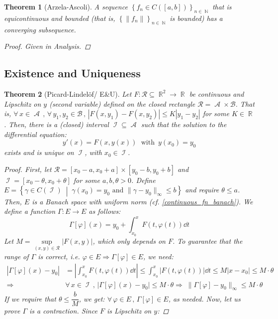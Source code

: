 \documentclass[12pt]{article}
\let\RA\Rightarrow
\newcommand{\set}[2]{\left\{{#1}\;\middle|\;{#2}\right\}}
\newcommand{\Forall}[1]{\forall\,{#1}\,,\,}
\DeclareMathOperator{\R}{\mathbb{R}}
\DeclareMathOperator{\N}{\mathbb{N}}
\DeclareMathOperator{\I}{\mathcal{I}}
\DeclareMathOperator{\A}{\mathcal{A}}
\newcommand{\seq}[2][n]{{\left\{#2\right\}}_{#1\in\N}}
\newtheorem{theorem}{Theorem}[subsection]
\begin{document}
\begin{theorem}[Arzela-Ascoli]
  \label{arzela_ascoli}
  A sequence $\seq{f_n\in C([a,b])}$ that is equicontinuous and bounded (that is, $\seq{\|f_n\|}$ is bounded) has a converging subsequence.
  \begin{proof}
    Given in Analysis.
  \end{proof}
\end{theorem}

\pagebreak

\subsection{Existence and Uniqueness}

\begin{theorem}[Picard-Lindelöf/ E\&U]
  \label{picard-lindelof}
  Let $F:\mathcal{R}\subseteq \R^2\to\R$ be continuous and Lipschitz on $y$ (second variable) defined on the closed rectangle $\mathcal{R}=\A\times\mathcal{B}$. That is, $\Forall{x\in\A}\Forall{y_1,y_2\in\mathcal{B}}|F(x,y_1)-F(x,y_2)|\leq K |y_1-y_2|$ for some $K\in\R$. Then, there is a (closed) interval $\I\subseteq\A$ such that the solution to the differential equation: $$y'(x)=F(x,y(x))\;\text{ with }\,y(x_0)=y_0$$ exists and is unique on $\I$, with $x_0\in\I$.
  \begin{proof}
    First, let $\mathcal{R}=[x_0-a,x_0+a]\times [y_0-b,y_0+b]$ and $\I=[x_0-\theta,x_0+\theta]$ for some $a,b,\theta>0$. Define $E=\set{\gamma\in C(\I)}{\gamma(x_0)=y_0\text{ and }\|\gamma-y_0\|_\infty\leq b}$ and require $\theta\leq a$. Then, $E$ is a Banach space with uniform norm (cf. \ref{continuous_fn_banach}).
    We define a function $\Gamma:E\to E$ as follows: $$\Gamma[\varphi](x)=y_0+\int_{x_0}^x F(t,\varphi(t))\dd{t}$$
    Let $M=\sup\limits_{(x,y)\in\mathcal{R}}|F(x,y)|$, which only depends on $F$. To guarantee that the range of $\Gamma$ is correct, i.e. $\varphi\in E\RA \Gamma[\varphi]\in E$, we need:
    \begin{align*}
      |\Gamma[\varphi](x)-y_0|&=\left|\int_{x_0}^x F(t,\varphi(t))\dd{t}\right|\leq \int_{x_0}^x \big|F(t,\varphi(t))\big|\dd{t}\leq M|x-x_0|\leq M\cdot\theta\\
      \RA& \Forall{x\in\I}\big|\Gamma[\varphi](x)-y_0\big|\leq M\cdot\theta \RA \;\big\|\Gamma[\varphi]-y_0\big\|_\infty\leq M\cdot\theta
    \end{align*}
    If we require that $\theta\leq\dfrac{b}{M}$, we get: $\Forall{\varphi\in E}\Gamma[\varphi]\in E$, as needed. Now, let us prove $\Gamma$ is a contraction. Since $F$ is Lipschitz on $y$:

\end{proof}
\end{theorem}
\end{document}
